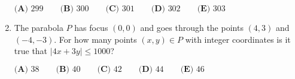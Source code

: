 \documentclass{article}
\begin{document}
\begin{enumerate}[label=\arabic*., itemsep=0.5em]
$\textbf{(A) }299\qquad
\textbf{(B) }300\qquad
\textbf{(C) }301\qquad
\textbf{(D) }302\qquad
\textbf{(E) }303\qquad$\par \vspace{0.5em}\item The parabola $P$ has focus $(0,0)$ and goes through the points $(4,3)$ and $(-4,-3)$.  For how many points $(x,y)\in P$ with integer coordinates is it true that $|4x+3y|\leq 1000$?

$\textbf{(A) }38\qquad
\textbf{(B) }40\qquad
\textbf{(C) }42\qquad
\textbf{(D) }44\qquad
\textbf{(E) }46\qquad$\par \vspace{0.5em}\end{enumerate}
\end{document}
